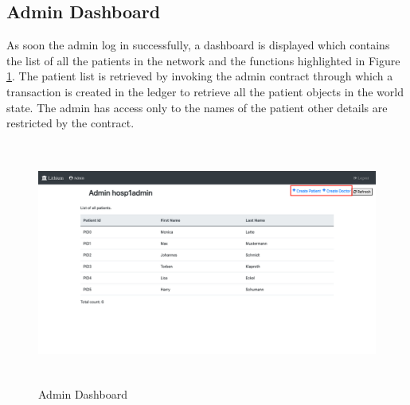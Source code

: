 \subsection{Admin Dashboard}
As soon the admin log in successfully, a dashboard is displayed which contains the list of all the patients in the network and the functions highlighted in Figure \ref{fig:chapter03:admin2}. The patient list is retrieved by invoking the admin contract through which a transaction is created in the ledger to retrieve all the patient objects in the world state. The admin has access only to the names of the patient other details are restricted by the contract.
\begin{figure}[htbp]
 \centering
 \includegraphics[height=8cm]{gfx/figures/admin2.png}
 \caption{Admin Dashboard}
 \label{fig:chapter03:admin2}
\end{figure}

